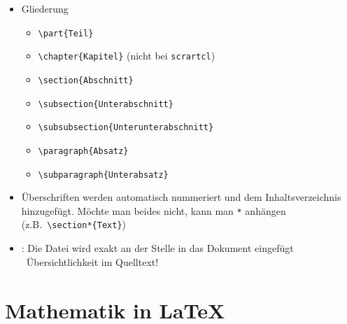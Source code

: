 \begin{frame}[<+->][fragile]
	\begin{itemize}
		\item Gliederung
		\begin{itemize}
			\item \lstinline!\part{Teil}!
			\item \lstinline!\chapter{Kapitel}! (nicht bei \texttt{scrartcl})
			\item \lstinline!\section{Abschnitt}!
			\item \lstinline!\subsection{Unterabschnitt}!
			\item \lstinline!\subsubsection{Unterunterabschnitt}!
			\item \lstinline!\paragraph{Absatz}!
			\item \lstinline!\subparagraph{Unterabsatz}!
		\end{itemize}
		\item Überschriften werden automatisch nummeriert und dem Inhaltsverzeichnis hinzugefügt. Möchte man beides nicht, kann man \lstinline!*! anhängen (z.B.\ \lstinline!\section*{Text}!)
		\item \lstinline!!: Die Datei wird exakt an der Stelle in das Dokument eingefügt \textrightarrow\ Übersichtlichkeit im Quelltext!
	\end{itemize}
\end{frame}

\section{Mathematik in \LaTeX}

